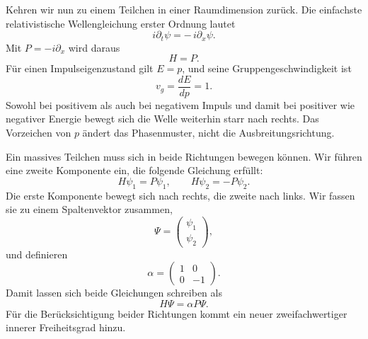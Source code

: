 Kehren wir nun zu einem Teilchen in einer Raumdimension zurück. Die einfachste relativistische Wellengleichung erster Ordnung lautet
\begin{equation}
i\partial_t\psi=-\,i\partial_x\psi.
\label{eq:l10-right-mover}
\end{equation}
Mit \(P=-i\partial_x\) wird daraus
\begin{equation}
H=P.
\end{equation}
Für einen Impulseigenzustand gilt \(E=p\), und seine Gruppengeschwindigkeit ist
\begin{equation}
v_g=\frac{dE}{dp}=1.
\end{equation}
Sowohl bei positivem als auch bei negativem Impuls und damit bei positiver wie negativer Energie bewegt sich die Welle weiterhin starr nach rechts. Das Vorzeichen von \(p\) ändert das Phasenmuster, nicht die Ausbreitungsrichtung.

Ein massives Teilchen muss sich in beide Richtungen bewegen können. Wir führen eine zweite Komponente ein, die folgende Gleichung erfüllt:
\begin{equation}
H\psi_1=P\psi_1,
\qquad
H\psi_2=-P\psi_2.
\label{eq:l10-two-directions}
\end{equation}
Die erste Komponente bewegt sich nach rechts, die zweite nach links. Wir fassen sie zu einem Spaltenvektor zusammen,
\begin{equation}
\Psi=
\begin{pmatrix}
\psi_1\\
\psi_2
\end{pmatrix},
\end{equation}
und definieren
\begin{equation}
\alpha=
\begin{pmatrix}
1&0\\
0&-1
\end{pmatrix}.
\end{equation}
Damit lassen sich beide Gleichungen schreiben als
\begin{equation}
H\Psi=\alpha P\Psi.
\label{eq:l10-massless-one-d}
\end{equation}
Für die Berücksichtigung beider Richtungen kommt ein neuer zweifachwertiger innerer Freiheitsgrad hinzu.

